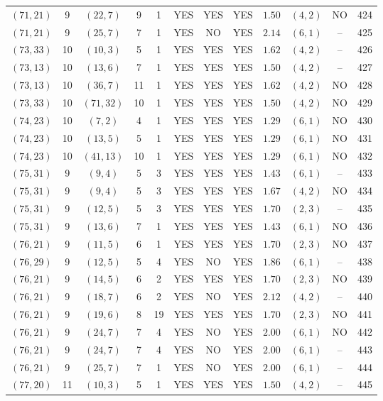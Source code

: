 \begin{longtable}{|c|c|c|c|c|c|c|c|c|c|c|c|}
$(71,21)$ & 9 & $(22,7)$ & 9 & 1 & YES & YES & YES & $1.50$ & $(4,2)$ & NO & 424\\
$(71,21)$ & 9 & $(25,7)$ & 7 & 1 & YES & NO & YES & $2.14$ & $(6,1)$ & -- & 425\\
$(73,33)$ & 10 & $(10,3)$ & 5 & 1 & YES & YES & YES & $1.62$ & $(4,2)$ & -- & 426\\
$(73,13)$ & 10 & $(13,6)$ & 7 & 1 & YES & YES & YES & $1.50$ & $(4,2)$ & -- & 427\\
$(73,13)$ & 10 & $(36,7)$ & 11 & 1 & YES & YES & YES & $1.62$ & $(4,2)$ & NO & 428\\
$(73,33)$ & 10 & $(71,32)$ & 10 & 1 & YES & YES & YES & $1.50$ & $(4,2)$ & NO & 429\\
$(74,23)$ & 10 & $(7,2)$ & 4 & 1 & YES & YES & YES & $1.29$ & $(6,1)$ & NO & 430\\
$(74,23)$ & 10 & $(13,5)$ & 5 & 1 & YES & YES & YES & $1.29$ & $(6,1)$ & NO & 431\\
$(74,23)$ & 10 & $(41,13)$ & 10 & 1 & YES & YES & YES & $1.29$ & $(6,1)$ & NO & 432\\
$(75,31)$ & 9 & $(9,4)$ & 5 & 3 & YES & YES & YES & $1.43$ & $(6,1)$ & -- & 433\\
$(75,31)$ & 9 & $(9,4)$ & 5 & 3 & YES & YES & YES & $1.67$ & $(4,2)$ & NO & 434\\
$(75,31)$ & 9 & $(12,5)$ & 5 & 3 & YES & YES & YES & $1.70$ & $(2,3)$ & -- & 435\\
$(75,31)$ & 9 & $(13,6)$ & 7 & 1 & YES & YES & YES & $1.43$ & $(6,1)$ & NO & 436\\
$(76,21)$ & 9 & $(11,5)$ & 6 & 1 & YES & YES & YES & $1.70$ & $(2,3)$ & NO & 437\\
$(76,29)$ & 9 & $(12,5)$ & 5 & 4 & YES & NO & YES & $1.86$ & $(6,1)$ & -- & 438\\
$(76,21)$ & 9 & $(14,5)$ & 6 & 2 & YES & YES & YES & $1.70$ & $(2,3)$ & NO & 439\\
$(76,21)$ & 9 & $(18,7)$ & 6 & 2 & YES & NO & YES & $2.12$ & $(4,2)$ & -- & 440\\
$(76,21)$ & 9 & $(19,6)$ & 8 & 19 & YES & YES & YES & $1.70$ & $(2,3)$ & NO & 441\\
$(76,21)$ & 9 & $(24,7)$ & 7 & 4 & YES & NO & YES & $2.00$ & $(6,1)$ & NO & 442\\
$(76,21)$ & 9 & $(24,7)$ & 7 & 4 & YES & NO & YES & $2.00$ & $(6,1)$ & -- & 443\\
$(76,21)$ & 9 & $(25,7)$ & 7 & 1 & YES & NO & YES & $2.00$ & $(6,1)$ & -- & 444\\
$(77,20)$ & 11 & $(10,3)$ & 5 & 1 & YES & YES & YES & $1.50$ & $(4,2)$ & -- & 445\\

\end{longtable}
